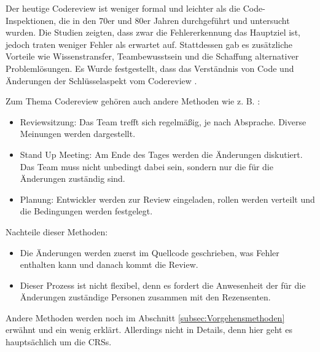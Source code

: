 
Der heutige Codereview ist weniger formal und leichter als die Code-Inspektionen, die in den 70er und 80er Jahren durchgeführt und untersucht wurden. Die Studien zeigten, dass zwar die Fehlererkennung das Hauptziel ist, jedoch traten weniger Fehler als erwartet auf. Stattdessen gab es zusätzliche Vorteile wie Wissenstransfer, Teambewusstsein und die Schaffung alternativer Problemlösungen. Es Wurde festgestellt, dass das Verständnis von Code und Änderungen der Schlüsselaspekt vom Codereview \cite{bacchelli2013expectations}.

Zum Thema Codereview gehören auch andere Methoden wie z. B. :

\begin{itemize}
	\item Reviewsitzung: Das Team trefft sich regelmäßig, je nach Absprache. Diverse Meinungen werden dargestellt.
	\item Stand Up Meeting: Am Ende des Tages werden die Änderungen diskutiert. Das Team muss nicht unbedingt dabei sein, sondern nur die für die Änderungen zuständig sind.
	\item Planung: Entwickler werden zur Review eingeladen, rollen werden verteilt und die Bedingungen werden festgelegt.
\end{itemize} 

Nachteile dieser Methoden:
\begin{itemize}
	\item Die Änderungen werden zuerst im Quellcode geschrieben, was Fehler enthalten kann und danach kommt die Review.
	\item Dieser Prozess ist nicht flexibel, denn es fordert die Anwesenheit der für die Änderungen zuständige Personen zusammen mit den Rezensenten.
\end{itemize}

Andere Methoden werden noch im Abschnitt \ref{subsec:Vorgehensmethoden} erwähnt und ein wenig erklärt. Allerdings nicht in Details, denn hier geht es hauptsächlich um die \acp{CRS}.
